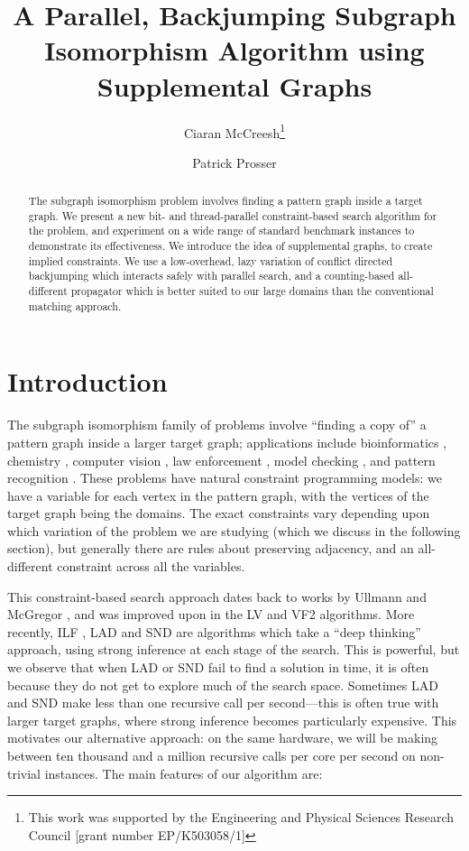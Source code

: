 \documentclass{llncs}
\title{A Parallel, Backjumping Subgraph Isomorphism Algorithm using Supplemental Graphs}
\author{Ciaran McCreesh\thanks{This work was supported by the Engineering and Physical Sciences
Research Council [grant number EP/K503058/1]} \and Patrick Prosser}
\institute{University of Glasgow, Glasgow, Scotland \\ \email{c.mccreesh.1@research.gla.ac.uk}, \\
    \email{patrick.prosser@glasgow.ac.uk}}
\begin{document}
\maketitle

\begin{abstract}
    The subgraph isomorphism problem involves finding a pattern graph inside a target graph.  We
    present a new bit- and thread-parallel constraint-based search algorithm for the problem, and
    experiment on a wide range of standard benchmark instances to demonstrate its effectiveness.  We
    introduce the idea of supplemental graphs, to create implied constraints. We use a low-overhead,
    lazy variation of conflict directed backjumping which interacts safely with parallel search, and
    a counting-based all-different propagator which is better suited to our large domains than the
    conventional matching approach.
\end{abstract}

\section{Introduction}

The subgraph isomorphism family of problems involve ``finding a copy of'' a pattern graph inside a
larger target graph; applications include bioinformatics \cite{Bonnici:2013}, chemistry
\cite{Regin:1995}, computer vision \cite{Damiand:2011,Solnon:2015}, law enforcement
\cite{Coffman:2004}, model checking \cite{Sevegnani:2015}, and pattern recognition
\cite{Conte:2004}.  These problems have natural constraint programming models: we have a variable
for each vertex in the pattern graph, with the vertices of the target graph being the domains. The
exact constraints vary depending upon which variation of the problem we are studying (which we
discuss in the following section), but generally there are rules about preserving adjacency, and an
all-different constraint across all the variables.

This constraint-based search approach dates back to works by Ullmann \cite{Ullmann:1976} and
McGregor \cite{McGregor:1979}, and was improved upon in the LV \cite{Larrosa:2002} and VF2
\cite{Cordella:2004} algorithms.  More recently, ILF \cite{Zampelli:2010}, LAD \cite{Solnon:2010}
and SND \cite{Audemard:2014} are algorithms which take a ``deep thinking'' approach, using strong
inference at each stage of the search.  This is powerful, but we observe that when LAD or SND fail
to find a solution in time, it is often because they do not get to explore much of the search space.
Sometimes LAD and SND make less than one recursive call per second---this is often true with larger
target graphs, where strong inference becomes particularly expensive.  This motivates our
alternative approach: on the same hardware, we will be making between ten thousand and a million
recursive calls per core per second on non-trivial instances.  The main features of our algorithm
are:
\end{document}
